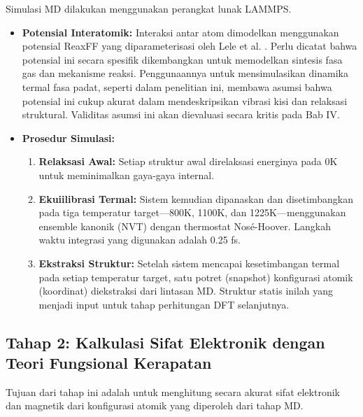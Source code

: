 Simulasi MD dilakukan menggunakan perangkat lunak LAMMPS.
\begin{itemize}
    \item \textbf{Potensial Interatomik:} Interaksi antar atom dimodelkan menggunakan potensial ReaxFF yang diparameterisasi oleh Lele et al. \citep{Lele2022}. Perlu dicatat bahwa potensial ini secara spesifik dikembangkan untuk memodelkan sintesis fasa gas dan mekanisme reaksi. Penggunaannya untuk mensimulasikan dinamika termal fasa padat, seperti dalam penelitian ini, membawa asumsi bahwa potensial ini cukup akurat dalam mendeskripsikan vibrasi kisi dan relaksasi struktural. Validitas asumsi ini akan dievaluasi secara kritis pada Bab IV.
    \item \textbf{Prosedur Simulasi:}
    \begin{enumerate}
        \item \textbf{Relaksasi Awal:} Setiap struktur awal direlaksasi energinya pada 0K untuk meminimalkan gaya-gaya internal.
        \item \textbf{Ekuiilibrasi Termal:} Sistem kemudian dipanaskan dan disetimbangkan pada tiga temperatur target—800K, 1100K, dan 1225K—menggunakan ensemble kanonik (NVT) dengan thermostat Nosé-Hoover. Langkah waktu integrasi yang digunakan adalah 0.25 fs.
        \item \textbf{Ekstraksi Struktur:} Setelah sistem mencapai kesetimbangan termal pada setiap temperatur target, satu potret (snapshot) konfigurasi atomik (koordinat) diekstraksi dari lintasan MD. Struktur statis inilah yang menjadi input untuk tahap perhitungan DFT selanjutnya.
    \end{enumerate}
\end{itemize}

\subsection{Tahap 2: Kalkulasi Sifat Elektronik dengan Teori Fungsional Kerapatan}
Tujuan dari tahap ini adalah untuk menghitung secara akurat sifat elektronik dan magnetik dari konfigurasi atomik yang diperoleh dari tahap MD.

